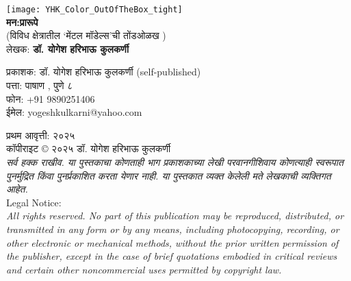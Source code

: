 \thispagestyle{empty}

\begin{center}
\texttt{[image: YHK\_Color\_OutOfTheBox\_tight]} \\[1.5em]

\textbf{\Huge मन:प्रारूपे}\\ [0.5em]
{\small(विविध क्षेत्रातील `मेंटल मॉडेल्स'ची तोंडओळख )}\\[0.5em]

लेखक: \textbf{{\large डॉ. योगेश हरिभाऊ कुलकर्णी}}\\[1.5em]
\end{center}

\vspace{3.5em}

\begin{flushleft}

प्रकाशक: डॉ. योगेश हरिभाऊ कुलकर्णी (self-published)\\
पत्ता:  पाषाण ,  पुणे ८ \\
फोन:  +91 9890251406\\
ईमेल: yogeshkulkarni@yahoo.com\\[1.5em]

\vspace{3.5em}

प्रथम आवृत्ती: २०२५\\[0.5em]


कॉपीराइट © २०२५ डॉ. योगेश हरिभाऊ कुलकर्णी\\[0.5em]

{\textit{सर्व हक्क राखीव. या पुस्तकाचा कोणताही भाग प्रकाशकाच्या लेखी परवानगीशिवाय कोणत्याही स्वरूपात पुनर्मुद्रित किंवा पुनर्प्रकाशित करता येणार नाही.  या पुस्तकात व्यक्त केलेली मते लेखकाची व्यक्तिगत आहेत.}}\\[1.5em]

{\large Legal Notice:}\\
{\textit{All rights reserved. No part of this publication may be reproduced, distributed, or transmitted in any form or by any means, including photocopying, recording, or other electronic or mechanical methods, without the prior written permission of the publisher, except in the case of brief quotations embodied in critical reviews and certain other noncommercial uses permitted by copyright law.}}
\end{flushleft}
\vfill\null
\clearpage

